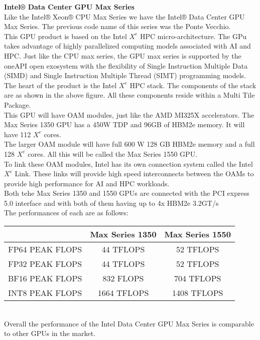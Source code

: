 \documentclass[12pt]{article}
\begin{document}
\textbf{Intel® Data Center GPU Max Series}\\
Like the Intel® Xeon® CPU Max Series we have the Intel® Data Center GPU Max Series. The previous code name of this series was the Ponte Vecchio.\\
This GPU product is based on the Intel $X^{e}$ HPC micro-architecture. The GPu takes advantage of highly parallelized computing models associated with AI and HPC. Just like the CPU max series, the GPU max series is supported by the oneAPI open exosystem with the flexibility of Single Instruction Multiple Data (SIMD) and Single Instruction Multiple Thread (SIMT) programming models.\\
The heart of the product is the Intel $X^{e}$ HPC stack. The components of the stack are as shown in the above figure. All these components reside within a Multi Tile Package.\\
This GPU will have OAM modules, just like the AMD MI325X accelerators. The Max Series 1350 GPU has a 450W TDP and 96GB of HBM2e memory. It will have 112 $X^{e}$ cores.\\
The larger OAM module will have full 600 W 128 GB HBM2e memory and a full 128 $X^{e}$ cores. All this will be called the Max Series 1550 GPU.\\
To link these OAM modules, Intel has its own connection system called the Intel $X^{e}$ Link. 
These links will provide high speed interconnects between the OAMs to provide high performance for AI and HPC workloads.\\
Both tehe Max Series 1350 and 1550 GPUs are connected with the PCI express 5.0 interface and with both of them having up to 4x HBM2e 3.2GT/s\\
The performances of each are as follows:\\
\begin{tabular}{c|c|c}
    \hline
    & Max Series 1350 & Max Series 1550\\
    \hline
    FP64 PEAK FLOPS & 44 TFLOPS & 52 TFLOPS\\
    FP32 PEAK FLOPS & 44 TFLOPS & 52 TFLOPS\\
    BF16 PEAK FLOPS & 832 FLOPS & 704 TFLOPS\\
    INT8 PEAK FLOPS & 1664 TFLOPS & 1408 TFLOPS\\
    \hline
\end{tabular}\\
Overall the performance of the Intel Data Center GPU Max Series is comparable to other GPUs in the market.
\end{document}
